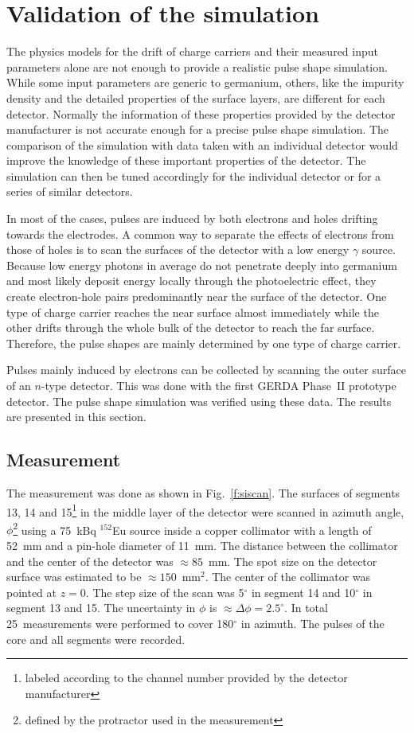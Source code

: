 \documentclass[epj]{svjour}
\begin{document}
\section{Validation of the simulation}
\label{s:psv}
The physics models \cite{miha,bart} for the drift of charge carriers
and their measured input parameters \cite{miha,reg,bart} alone are not
enough to provide a realistic pulse shape simulation. While some input
parameters are generic to germanium, others, like the impurity density
and the detailed properties of the surface layers, are different for
each detector. Normally the information of these properties provided
by the detector manufacturer is not accurate enough for a precise
pulse shape simulation. The comparison of the simulation with data
taken with an individual detector would improve the knowledge of these
important properties of the detector. The simulation can then be tuned
accordingly for the individual detector or for a series of similar
detectors.

In most of the cases, pulses are induced by both electrons and holes
drifting towards the electrodes. A common way to separate the effects
of electrons from those of holes is to scan the surfaces of the
detector with a low energy $\gamma$ source. Because low energy photons
in average do not penetrate deeply into germanium and most likely
deposit energy locally through the photoelectric effect, they create
electron-hole pairs predominantly near the surface of the
detector. One type of charge carrier reaches the near surface almost
immediately while the other drifts through the whole bulk of the
detector to reach the far surface. Therefore, the pulse shapes are
mainly determined by one type of charge carrier.

Pulses mainly induced by electrons can be collected by scanning the
outer surface of an $n$-type detector. This was done with the first
GERDA Phase~II prototype detector. \cite{si} The pulse shape
simulation was verified using these data. The results are presented in
this section.

\subsection{Measurement}
\label{s:char}
The measurement was done as shown in Fig.~\ref{f:siscan}. The surfaces
of segments 13, 14 and 15\footnote{labeled according to the channel
number provided by the detector manufacturer} in the middle layer of
the detector were scanned in azimuth angle, $\phi$\footnote{defined by
the protractor used in the measurement} using a 75~kBq $^{152}$Eu
source inside a copper collimator with a length of 52~mm and a
pin-hole diameter of 11~mm. The distance between the collimator and
the center of the detector was $\approx 85$~mm. The spot size on the
detector surface was estimated to be $\approx 150$~mm$^{2}$. The
center of the collimator was pointed at $z = 0$. The step size of the
scan was 5$^{\circ}$ in segment 14 and 10$^{\circ}$ in segment 13 and
15. The uncertainty in $\phi$ is $\approx \Delta \phi=2.5^{\circ}$. In
total 25~measurements were performed to cover 180$^{\circ}$ in
azimuth. The pulses of the core and all segments were recorded.
\end{document}
